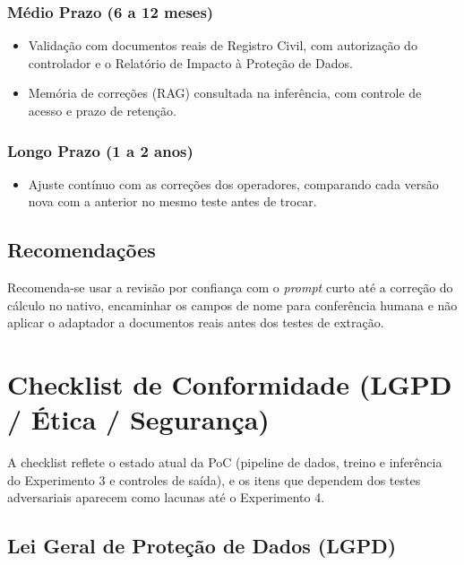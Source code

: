 \documentclass[12pt,a4paper]{article}
\begin{document}
\subsubsection{Médio Prazo (6 a 12 meses)}
\begin{itemize}
    \item Validação com documentos reais de Registro Civil, com autorização do controlador e o Relatório de Impacto à Proteção de Dados.
    \item Memória de correções (RAG) consultada na inferência, com controle de acesso e prazo de retenção.
\end{itemize}

\subsubsection{Longo Prazo (1 a 2 anos)}
\begin{itemize}
    \item Ajuste contínuo com as correções dos operadores, comparando cada versão nova com a anterior no mesmo teste antes de trocar.
\end{itemize}

\subsection{Recomendações}
Recomenda-se usar a revisão por confiança com o \emph{prompt} curto até a correção do cálculo no nativo, encaminhar os campos de nome para conferência humana e não aplicar o adaptador a documentos reais antes dos testes de extração.

\section{Checklist de Conformidade (LGPD / Ética / Segurança)}
\label{sec:checklist}

A checklist reflete o estado atual da PoC (pipeline de dados, treino e inferência do Experimento 3 e controles de saída), e os itens que dependem dos testes adversariais aparecem como lacunas até o Experimento 4.

\subsection{Lei Geral de Proteção de Dados (LGPD)}
\end{document}
